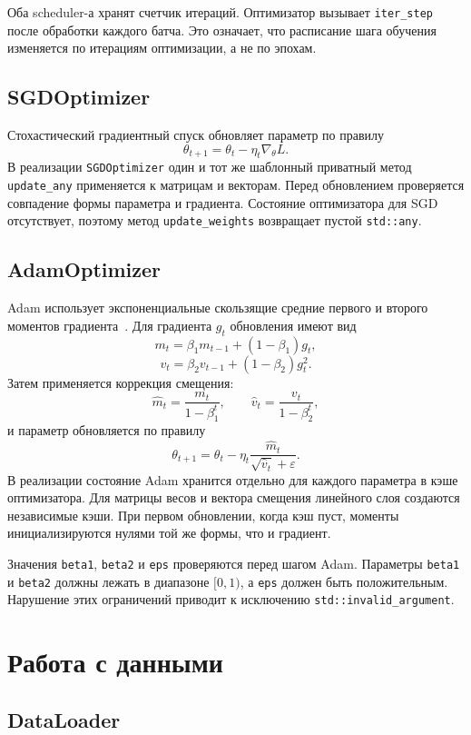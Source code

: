 \documentclass{article}
\begin{document}
Оба scheduler-а хранят счетчик итераций. Оптимизатор вызывает
\texttt{iter\_step} после обработки каждого батча. Это означает, что
расписание шага обучения изменяется по итерациям оптимизации, а не по
эпохам.

\subsection{SGDOptimizer}

Стохастический градиентный спуск обновляет параметр по правилу
\[
    \theta_{t+1} = \theta_t - \eta_t \nabla_{\theta} L.
\]
В реализации \texttt{SGDOptimizer} один и тот же шаблонный приватный
метод \texttt{update\_any} применяется к матрицам и векторам. Перед
обновлением проверяется совпадение формы параметра и градиента.
Состояние оптимизатора для SGD отсутствует, поэтому метод
\texttt{update\_weights} возвращает пустой \texttt{std::any}.

\subsection{AdamOptimizer}

Adam использует экспоненциальные скользящие средние первого и второго
моментов градиента~\cite{kingma2014adam}. Для градиента $g_t$
обновления имеют вид
\[
    m_t = \beta_1 m_{t-1} + (1-\beta_1)g_t,
\]
\[
    v_t = \beta_2 v_{t-1} + (1-\beta_2)g_t^2.
\]
Затем применяется коррекция смещения:
\[
    \hat{m}_t = \frac{m_t}{1-\beta_1^t},
    \qquad
    \hat{v}_t = \frac{v_t}{1-\beta_2^t},
\]
и параметр обновляется по правилу
\[
    \theta_{t+1} = \theta_t - \eta_t
    \frac{\hat{m}_t}{\sqrt{\hat{v}_t}+\varepsilon}.
\]
В реализации состояние Adam хранится отдельно для каждого параметра в
кэше оптимизатора. Для матрицы весов и вектора смещения линейного слоя
создаются независимые кэши. При первом обновлении, когда кэш пуст,
моменты инициализируются нулями той же формы, что и градиент.

Значения \texttt{beta1}, \texttt{beta2} и \texttt{eps} проверяются
перед шагом Adam. Параметры \texttt{beta1} и \texttt{beta2} должны
лежать в диапазоне $[0,1)$, а \texttt{eps} должен быть положительным.
Нарушение этих ограничений приводит к исключению
\texttt{std::invalid\_argument}.

\section{Работа с данными}

\subsection{DataLoader}
\end{document}
